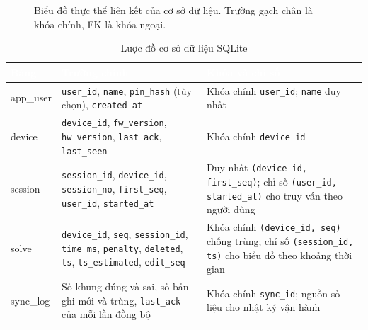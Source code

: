 \begin{figure}[H]
    \caption{Biểu đồ thực thể liên kết của cơ sở dữ liệu. Trường gạch chân là khóa chính, FK là khóa ngoại.}
    \label{fig:er}
\end{figure}

\begin{table}[H]
    \centering
    \small
    \renewcommand{\arraystretch}{1.35}
    \caption{Lược đồ cơ sở dữ liệu SQLite}
    \label{tab:schema}
    \begin{tabular}{>{\ttfamily\raggedright\arraybackslash}m{1.9cm} >{\raggedright\arraybackslash}m{6.6cm} >{\raggedright\arraybackslash}m{5.4cm}}
        \toprule
        \rowcolor{haitayblue}
        \textcolor{white}{Bảng} & \textcolor{white}{Trường chính} & \textcolor{white}{Khóa và chỉ số} \\
        \midrule
        \rowcolor{haitayblue!8}
        app\_user & \texttt{user\_id}, \texttt{name}, \texttt{pin\_hash} (tùy chọn), \texttt{created\_at} & Khóa chính \texttt{user\_id}; \texttt{name} duy nhất \\
        device & \texttt{device\_id}, \texttt{fw\_version}, \texttt{hw\_version}, \texttt{last\_ack}, \texttt{last\_seen} & Khóa chính \texttt{device\_id} \\
        \rowcolor{haitayblue!8}
        session & \texttt{session\_id}, \texttt{device\_id}, \texttt{session\_no}, \texttt{first\_seq}, \texttt{user\_id}, \texttt{started\_at} & Duy nhất \texttt{(device\_id, first\_seq)}; chỉ số \texttt{(user\_id, started\_at)} cho truy vấn theo người dùng \\
        solve & \texttt{device\_id}, \texttt{seq}, \texttt{session\_id}, \texttt{time\_ms}, \texttt{penalty}, \texttt{deleted}, \texttt{ts}, \texttt{ts\_estimated}, \texttt{edit\_seq} & Khóa chính \texttt{(device\_id, seq)} chống trùng; chỉ số \texttt{(session\_id, ts)} cho biểu đồ theo khoảng thời gian \\
        \rowcolor{haitayblue!8}
        sync\_log & Số khung đúng và sai, số bản ghi mới và trùng, \texttt{last\_ack} của mỗi lần đồng bộ & Khóa chính \texttt{sync\_id}; nguồn số liệu cho nhật ký vận hành \\
        \bottomrule
    \end{tabular}
\end{table}

